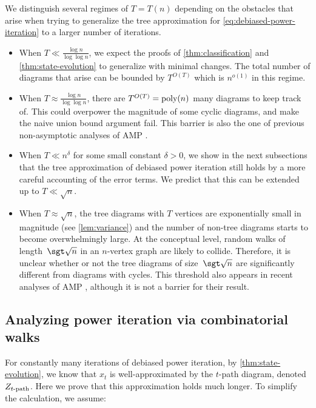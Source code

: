 \documentclass[12pt]{article}
\begin{document}
We distinguish several regimes of $T=T(n)$ depending on the obstacles that arise when trying to generalize the tree approximation for \cref{eq:debiased-power-iteration} to a larger number of iterations.
\begin{itemize}
    \item When $T\ll \frac {\log n} {\log \log n}$, we expect the proofs of \cref{thm:classification} and \cref{thm:state-evolution} to generalize with minimal changes.
    The total number of diagrams that arise can be bounded by $T^{O(T)}$ which is $n^{o(1)}$ in this regime.
    
    \item When $T\approx \frac {\log n} {\log \log n}$, there are $T^{O(T)} = \textnormal{poly}(n)$ many diagrams to keep track of. This could overpower the magnitude of some cyclic diagrams, and make the naive union bound argument fail. 
    This barrier is also the one of previous non-asymptotic analyses of AMP \cite{rush2018finite, cademartori2023non}. 

    \item When $T \ll n^{\delta}$ for some small constant $\delta>0$, we show in the next subsections that the tree approximation of debiased power iteration still holds by a more careful accounting of the error terms.
    We predict that this can be extended up to $T \ll \sqrt{n}$.
      
    \item When $T\approx \sqrt n$, the tree diagrams with $T$ vertices are exponentially small in magnitude (see \cref{lem:variance}) and the number of non-tree diagrams
    starts to become overwhelmingly large. At the conceptual level, random walks of length~$\sgt \sqrt{n}$ in an $n$-vertex graph are likely to collide.
    Therefore, it is unclear whether or not the tree diagrams
    of size~$\sgt \sqrt{n}$ are significantly different from
    diagrams with cycles. This threshold also appears in recent analyses of AMP \cite{LFW23}, although it is not a barrier for their result.
\end{itemize}



\subsection{Analyzing power iteration via combinatorial walks}


For constantly many iterations of debiased power iteration, by \cref{thm:state-evolution}, we know that $x_t$ is well-approximated by the $t$-path diagram, denoted $Z_{t\textnormal{-path}}$.
Here we prove that this approximation holds much longer.
To simplify the calculation, we assume:
\end{document}

